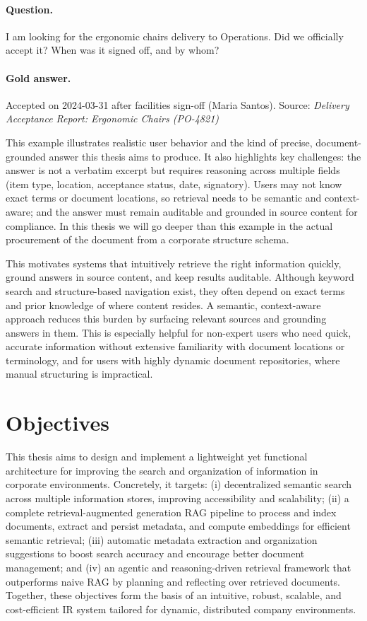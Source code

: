 \paragraph{Question.} I am looking for the ergonomic chairs delivery to Operations. Did we officially accept it? When was it signed off, and by whom?

\paragraph{Gold answer.} Accepted on 2024-03-31 after facilities sign-off (Maria Santos). Source: \textit{Delivery Acceptance Report: Ergonomic Chairs (PO-4821)}

This example illustrates realistic user behavior and the kind of precise, document-grounded answer this thesis aims to produce. It also highlights key challenges: the answer is not a verbatim excerpt but requires reasoning across multiple fields (item type, location, acceptance status, date, signatory). Users may not know exact terms or document locations, so retrieval needs to be semantic and context-aware; and the answer must remain auditable and grounded in source content for compliance.
In this thesis we will go deeper than this example in the actual procurement of the document from a corporate structure schema.

This motivates systems that intuitively retrieve the right information quickly, ground answers in source content, and keep results auditable. Although keyword search and structure-based navigation exist, they often depend on exact terms and prior knowledge of where content resides. A semantic, context-aware approach reduces this burden by surfacing relevant sources and grounding answers in them. 
This is especially helpful for non-expert users who need quick, accurate information without extensive familiarity with document locations or terminology, and for users with highly dynamic document repositories, where manual structuring is impractical.

\section{Objectives}
This thesis aims to design and implement a lightweight yet functional architecture for improving the search and organization of information in corporate environments. Concretely, it targets: (i) decentralized semantic search across multiple information stores,  improving accessibility and scalability; (ii) a complete retrieval-augmented generation \gls{RAG} pipeline to process and index documents, extract and persist metadata, and compute embeddings for efficient semantic retrieval; (iii) automatic metadata extraction and organization suggestions to boost search accuracy and encourage better document management; and (iv) an agentic and reasoning-driven retrieval framework that outperforms naive \gls{RAG} by planning and reflecting over retrieved documents. Together, these objectives form the basis of an intuitive, robust, scalable, and cost-efficient \gls{IR} system tailored for dynamic, distributed company environments.

